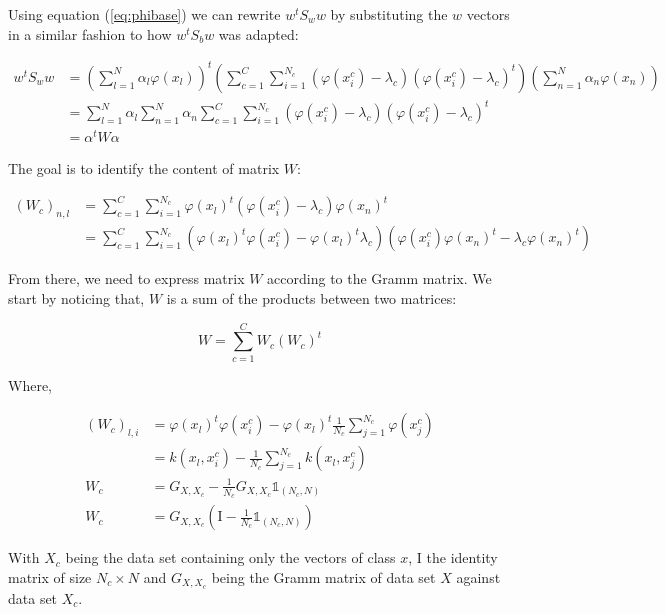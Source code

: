Using equation (\ref{eq:phibase}) we can rewrite $w^tS_ww$ by substituting the $w$ vectors in a similar fashion
to how $w^tS_bw$ was adapted:

\begin{align*}
  w^tS_ww &= \left( \sum_{l=1}^N \alpha_l \varphi(x_l)\right)^t
             \left( \sum_{c=1}^C \sum_{i=1}^{N_c} (\varphi(x_i^c) - \lambda_c) (\varphi(x_i^c) - \lambda_c)^t\right) \left( \sum_{n=1}^N \alpha_n \varphi(x_n)\right) \\
          &= \sum_{l=1}^N \alpha_l \sum_{n=1}^N \alpha_n \sum_{c=1}^C                 \sum_{i=1}^{N_c} (\varphi(x_i^c) - \lambda_c)
                                 (\varphi(x_i^c) - \lambda_c)^t \\
&= \alpha^tW\alpha
\end{align*}


The goal is to identify the content of matrix $W$:

\begin{align*}
  (W_c)_{n,l} &= \sum_{c=1}^C \sum_{i=1}^{N_c}
                  \varphi(x_l)^t(\varphi(x_i^c) - \lambda_c)\varphi(x_n)^t \\
            &= \sum_{c=1}^C \sum_{i=1}^{N_c} (\varphi(x_l)^t\varphi(x_i^c) -
            \varphi(x_l)^t\lambda_c) (\varphi(x_i^c)\varphi(x_n)^t -
            \lambda_c \varphi(x_n)^t)
\end{align*}

From there, we need to express matrix $W$ according to the Gramm matrix. We start by noticing that,
$W$ is a sum of the products between two matrices:

\begin{equation*}
W = \sum_{c=1}^C W_c (W_c)^t
\end{equation*}

Where,

\begin{align*}
  (W_c)_{l, i} &= \varphi(x_l)^t\varphi(x_i^c) - \varphi(x_l)^t \frac{1}{N_c}\sum_{j=1}^{N_c}\varphi(x_j^c) \\
             &= k(x_l, x_i^c) - \frac{1}{N_c}\sum_{j=1}^{N_c}k(x_l, x_j^c) \\
   W_c       &= G_{X, X_c} - \frac{1}{N_c} G_{X, X_c} \mathds{1}_{(N_c, N)} \\
   W_c       &= G_{X, X_c} \left(\textrm{I} - \frac{1}{N_c}\mathds{1}_{(N_c, N)}\right)
\end{align*}

With $X_c$ being the data set containing only the vectors of class $x$, $\textrm{I}$ the identity matrix of
size $N_c \times N$ and
$G_{X, X_c}$ being the Gramm matrix of data set $X$ against data set $X_c$.

